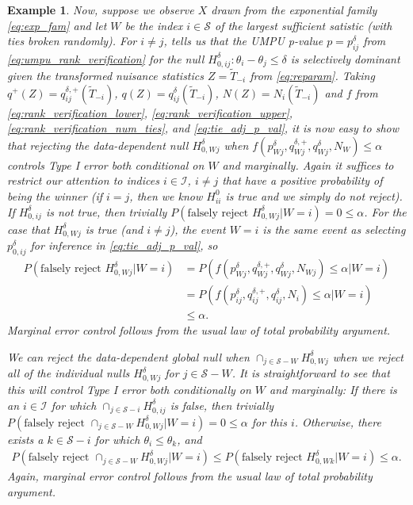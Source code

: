 \documentclass{article}
\newtheorem{example}{Example}
\begin{document}
\begin{appendix}
\begin{example}
    Now, suppose we observe $X$ drawn from the exponential family \eqref{eq:exp_fam} and let $W$ be the index $i \in \mathcal{S}$ of the largest sufficient satistic (with ties broken randomly). For $i \neq j$,  tells us that the UMPU p-value $p = p_{ij}^{\delta}$ from \eqref{eq:umpu_rank_verification} for the null $H_{0, ij}^{\delta}: \theta_i - \theta_j \leq \delta$ is selectively dominant given the transformed nuisance statistics $Z = \widetilde{T}_{-i}$ from \eqref{eq:reparam}. Taking $q^+(Z) = q^{\delta, +}_{ij}( \widetilde{T}_{-i})$, $q(Z) = q^{\delta}_{ij}( \widetilde{T}_{-i})$, $N(Z) = N_{i}(\widetilde{T}_{-i})$ and $f$ from  \eqref{eq:rank_verification_lower}, \eqref{eq:rank_verification_upper}, \eqref{eq:rank_verification_num_ties}, and \eqref{eq:tie_adj_p_val}, it is now easy to show that rejecting the data-dependent null $H^{\delta}_{0, Wj}$ when $f(p^{\delta}_{Wj}, q^{\delta, +}_{Wj}, q^{\delta}_{Wj}, N_{W}) \leq \alpha$ controls Type I error both conditional on $W$ and marginally. Again it suffices to restrict our attention to indices $i \in \mathcal{I}$, $i \neq j$ that have a positive probability of being the winner (if $i=j$, then we know $H^0_{ii}$ is true and we simply do not reject). If $H^{\delta}_{0, ij}$ is not true, then trivially $P(\text{falsely reject } H^{\delta}_{0, Wj}| W= i) = 0 \leq \alpha$. For the case that $H^{\delta}_{0, Wj}$ is true (and $i \neq j$), the event $W=i$ is the same event as selecting $p_{0, ij}^{\delta}$ for inference in \eqref{eq:tie_adj_p_val}, so 
    \begin{align*}
        P(\text{falsely reject } H^{\delta}_{0, Wj}| W= i) &= P(f(p^{\delta}_{Wj}, q^{\delta, +}_{Wj}, q^{\delta}_{Wj}, N_{Wj}) \leq \alpha | W= i) \\
        &= P(f(p^{\delta}_{ij}, q^{\delta, +}_{ij}, q^{\delta}_{ij}, N_i) \leq \alpha | W = i) \\
        &\leq \alpha. 
    \end{align*}
    Marginal error control follows from the usual law of total probability argument.

    We can reject the data-dependent global null when  $\cap_{j \in \mathcal{S} - W} H^{\delta}_{0, Wj}$ when we reject all of the individual nulls $H^{\delta}_{0, Wj}$ for $j \in \mathcal{S} - W$. It is straightforward to see that this will control Type I error both conditionally on $W$ and marginally: If there is an $i \in \mathcal{I}$ for which $\cap_{j \in \mathcal{S} - i} H^{\delta}_{0, ij}$ is false, then trivially $P(\text{falsely reject } \cap_{j \in \mathcal{S} - W} H^{\delta}_{0, Wj}| W= i) = 0 \leq \alpha$ for this $i$. Otherwise, there exists a $k \in \mathcal{S} - i$ for which $\theta_i \leq \theta_k$, and 
    \begin{align*}
        P(\text{falsely reject } \cap_{j \in \mathcal{S} - W} H^{\delta}_{0, Wj}| W= i) \leq P(\text{falsely reject } H^{\delta}_{0, Wk}| W= i) \leq \alpha.\
    \end{align*} 
    Again, marginal error control follows from the usual law of total probability argument.
\end{example}


\end{appendix}
\end{document}
